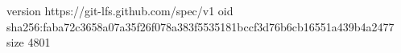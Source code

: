 version https://git-lfs.github.com/spec/v1
oid sha256:faba72c3658a07a35f26f078a383f5535181bccf3d76b6cb16551a439b4a2477
size 4801
